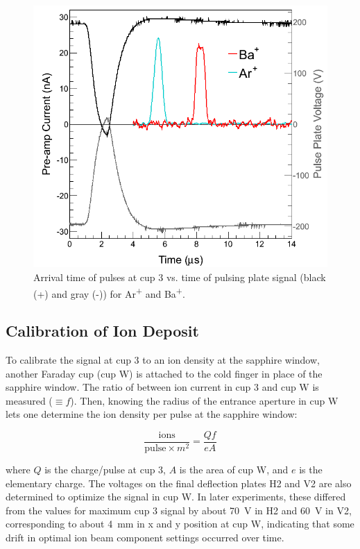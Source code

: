 \begin{figure}[h]
        \centering
                \includegraphics[width=.7\textwidth]{figures/pulses_BaAr.png}
                \caption{Arrival time of pulses at cup 3 vs. time of pulsing plate signal (black (+) and gray (-)) for Ar\textsuperscript{+} and Ba\textsuperscript{+}.}
\label{fig:pulses_ArBa}
\end{figure}

\subsection{Calibration of Ion Deposit}
\label{subsec:ionDepCal}

To calibrate the signal at cup 3 to an ion density at the sapphire window, another Faraday cup (cup W) is attached to the cold finger in place of the sapphire window.  The ratio of between ion current in cup 3 and cup W is measured ($\equiv f$).  Then, knowing the radius of the entrance aperture in cup W lets one determine the ion density per pulse at the sapphire window:

\begin{equation}
\frac{\text{ions}}{\text{pulse} \times m^{2}} = \frac{Q f}{e A}
\label{eqn:ion_density}
\end{equation}

\noindent
where $Q$ is the charge/pulse at cup 3, $A$ is the area of cup W, and $e$ is the elementary charge.  The voltages on the final deflection plates H2 and V2 are also determined to optimize the signal in cup W.  In later experiments, these differed from the values for maximum cup 3 signal by about 70~V in H2 and 60~V in V2, corresponding to about 4~mm in x and y position at cup W, indicating that some drift in optimal ion beam component settings occurred over time.

